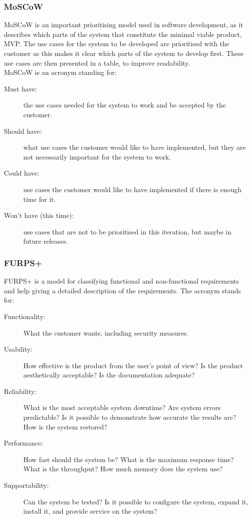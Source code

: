 \subsubsection{MoSCoW}
MoSCoW is an important prioritising model used in software development, as it
describes which parts of the system that constitute the minimal viable product,
MVP. The use cases for the system to be developed are prioritised with the
customer as this makes it clear which parts of the system to develop first. \cite{moscow}
These use cases are then presented in a table, to improve readability.\\

MoSCoW is an acronym standing for:\\

\begin{description}
    \item [Must have:] the use cases needed for the system to work and be
    accepted by the customer.

    \item [Should have:] what use cases the customer would like to have
    implemented, but they are not necessarily important for the system to work.

    \item [Could have:] use cases the customer would like to have implemented if
    there is enough time for it.

    \item [Won't have (this time):] use cases that are not to be prioritised in
    this iteration, but maybe in future releases.
\end{description}

\subsubsection{FURPS+}
FURPS+ is a model for classifying functional and non-functional requirements and
help giving a detailed description of the requirements. \cite{furps} The acronym stands for: 

\begin{description}
    \item [Functionality:] What the customer wants, including security measures.

    \item [Usability:] How effective is the product from the user's point of
    view? Is the product aesthetically acceptable? Is the documentation adequate?

    \item [Reliability:] What is the most acceptable system downtime? Are system
    errors predictable? Is it possible to demonstrate how accurate the results
    are? How is the system restored?

    \item [Performance:] How fast should the system be? What is the maximum
    response time? What is the throughput? How much memory does the system use?

    \item [Supportability:] Can the system be tested? Is it possible to
    configure the system, expand it, install it, and provide service on the
    system?
\end{description}

